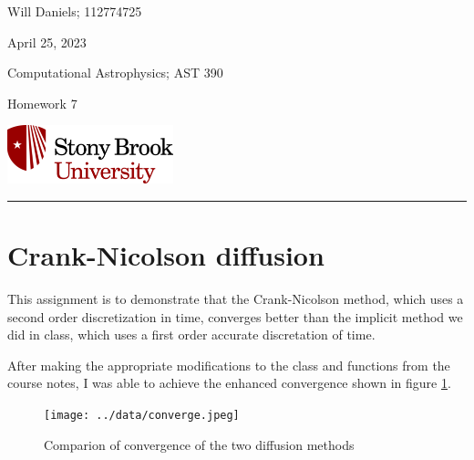 \documentclass[12pt, letterpaper]{article}
\begin{document}
\noindent
\begin{minipage}{0.5\textwidth}
    Will Daniels; 112774725

    April 25, 2023

    Computational Astrophysics; AST 390

    Homework 7
\end{minipage}
%
\begin{minipage}{0.5\textwidth}
    \begin{flushright}
        \includegraphics[height = 48pt]{../../LatexAssets/SBULogoStacked}
    \end{flushright}
\end{minipage}
\noindent
\rule{\textwidth}{1pt}

\section{Crank-Nicolson diffusion}
This assignment is to demonstrate that the Crank-Nicolson method, which uses a
second order discretization in time, converges better than the implicit method
we did in class, which uses a first order accurate discretation of time.

After making the appropriate modifications to the class and functions from the
course notes, I was able to achieve the enhanced convergence shown in figure
\ref{fig:converge}.

\begin{figure}[!h]
  \centering
  \caption{Comparion of convergence of the two diffusion methods}
  \label{fig:converge}
  \texttt{[image: ../data/converge.jpeg]}
\end{figure}
\end{document}
